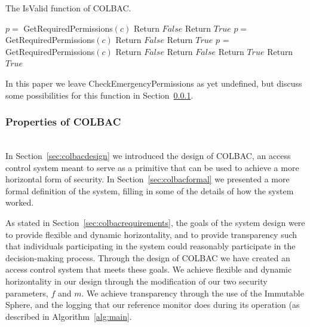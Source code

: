 \begin{algorithm}
\caption{The IsValid function of COLBAC.}
\label{alg:isvalid}
\begin{algorithmic}[1]
         
            \State $p =$ GetRequiredPermissions$(c)$
                \State Return $False$
            \EndIf
        \EndFor
        \State Return $True$
    \Else
        \State $p =$ GetRequiredPermissions$(c)$
            \State Return $False$
        \EndIf
        \State Return $True$
    \EndIf
{}
     
        \State $p$ = GetRequiredPermissions$(c)$
            \State Return $False$
                \State Return $False$
            \EndIf
            \State Return $True$
        \Else {}
            \State Return $True$
        \EndIf
    \EndFor
\EndIf
\EndProcedure
\end{algorithmic}
\end{algorithm}

In this paper we leave CheckEmergencyPermissions as yet undefined, but discuss
some possibilities for this function in Section~\ref{sec:colbacproperties}.

\subsubsection{Properties of COLBAC}
\label{sec:colbacproperties}
\mbox{}\\
In Section~\ref{sec:colbacdesign} we introduced the design of COLBAC, an access
control system meant to serve as a primitive that can be used to achieve a more
horizontal form of security. In Section~\ref{sec:colbacformal} we presented a
more formal definition of the system, filling in some of the details of how the
system worked.

As stated in Section~\ref{sec:colbacrequirements}, the goals of the system
design were to provide flexible and dynamic horizontality, and to provide
transparency such that individuals participating in the system could reasonably
participate in the decision-making process. Through the design of COLBAC we have
created an access control system that meets these goals. We achieve flexible and
dynamic horizontality in our design through the modification of our two security
parameters, $f$ and $m$. We achieve transparency through the use of the
Immutable Sphere, and the logging that our reference monitor does during its
operation (as described in Algorithm~\ref{alg:main}.

